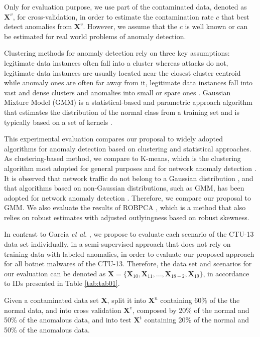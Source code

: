 \documentclass[review]{elsarticle}
\begin{document}
Only for evaluation purpose, we use part of the contaminated data, denoted as $\textbf{X}^v$, for cross-validation, in order to estimate the contamination rate $c$ that best detect anomalies from $\textbf{X}^v$. However, we assume that the $c$ is well known or can be estimated for real world problems of anomaly detection.

Clustering methods for anomaly detection rely on three key assumptions: legitimate data instances often fall into a cluster whereas attacks do not, legitimate data instances are usually located near the closest cluster centroid while anomaly ones are often far away from it, legitimate data instances fall into vast and dense clusters and anomalies into small or spare ones \cite{ahmed2016survey, moustafa2019holistic}. Gaussian Mixture Model (GMM) is a statistical-based and parametric approach algorithm that estimates the distribution of the normal class from a training set and is typically based on a set of kernels \cite{moustafa2019holistic}.

This experimental evaluation compares our proposal to widely adopted algorithms for anomaly detection based on clustering and statistical approaches. As clustering-based method, we compare to K-means, which is the clustering algorithm most adopted for general purposes and for network anomaly detection \cite{gaddam2007kmeans,moustafa2019holistic}. It is observed that network traffic do not belong to a Gaussian distribution \cite{benson2010network,moustafa2019holistic}, and that algorithms based on non-Gaussian distributions, such as GMM, has been adopted for network anomaly detection \cite{moustafa2019holistic}. Therefore, we compare our proposal to GMM. We also evaluate the results of ROBPCA \cite{hubert2005robpca}, which is a method that also relies on robust estimates with adjusted outlyingness based on robust skewness. 

In contrast to Garcia \emph{et al.} \cite{garcia2014empirical}, we propose to evaluate each scenario of the CTU-13 data set individually, in a semi-supervised approach that does not rely on training data with labeled anomalies, in order to evaluate our proposed approach for all botnet malwares of the CTU-13. Therefore, the data set and scenarios for our evaluation can be denoted as $\boldsymbol{X} = \{\boldsymbol{X}_{10}, \boldsymbol{X}_{11}, ... , \boldsymbol{X}_{18-2}, \boldsymbol{X}_{19}\}$, in accordance to IDs presented in Table \ref{tab:tab01}.

Given a contaminated data set $\boldsymbol{X}$, split it into $\boldsymbol{X}^n$ containing 60\% of the the normal data, and into cross validation $\boldsymbol{X}^v$, composed by 20\% of the normal and 50\% of the anomalous data, and into test $\boldsymbol{X}^t$ containing 20\% of the normal and 50\% of the anomalous data.
\end{document}
